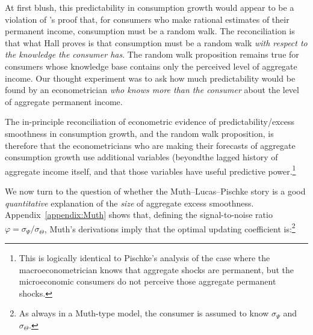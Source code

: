 \documentclass[titlepage]{\econtex}\newcommand{\texname}{cAndCwithStickyE}
\begin{document}
At first blush, this predictability in consumption growth would appear to be a violation of \cite{hallRandomWalk}'s proof that, for consumers who make rational estimates of their permanent income, consumption must be a random walk.  The reconciliation is that what Hall proves is that consumption must be a random walk {\it with respect to the knowledge the consumer has}.  The random walk proposition remains true for consumers whose knowledge base contains only the perceived level of aggregate income.  Our thought experiment was to ask how much predictability would be found by an econometrician {\it who knows more than the consumer} about the level of aggregate permanent income.

The in-principle reconciliation of econometric evidence of predictability/excess smoothness in consumption growth, and the random walk proposition, is therefore that the econometricians who are making their forecasts of aggregate consumption growth use additional variables (beyondthe lagged history of aggregate income itself, and that those variables have useful predictive power.\footnote{This is logically identical to Pischke's analysis of the case where the macroeconometrician knows that aggregate shocks are permanent, but the microeconomic consumers do not perceive those aggregate permanent shocks.}

We now turn to the question of whether the Muth--Lucas--Pischke story is a good {\it quantitative} explanation of the {\it size} of aggregate excess smoothness.  Appendix~\ref{appendix:Muth} shows that, defining the signal-to-noise ratio $\varphi=\sigma_{\Psi}/\sigma_{\Theta}$, Muth's derivations imply that the optimal updating coefficient is:\footnote{As always in a Muth-type model, the consumer is assumed to know $\sigma_{\Psi}$ and $\sigma_{\Theta}$.}  

\providecommand{\PischkePi}{0.83}
\providecommand{\PischkePiCancel}{0.17}
 \providecommand{\fromFile}{false}
 \providecommand{\FileOrNot}{\ifthenelse{\boolean{\fromFile}}}
\end{document}
